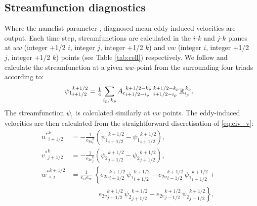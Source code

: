 \documentclass[../main/NEMO_manual]{subfiles}
\begin{document}
\subsection{Streamfunction diagnostics}
\label{sec:sfdiag}

Where the namelist parameter ,
diagnosed mean eddy-induced velocities are output.
Each time step, streamfunctions are calculated in the $i$-$k$ and $j$-$k$ planes at
$uw$ (integer +1/2 $i$, integer $j$, integer +1/2 $k$) and $vw$ (integer $i$, integer +1/2 $j$, integer +1/2 $k$)
points (see Table \autoref{tab:cell}) respectively.
We follow \citep{Griffies_Bk04} and calculate the streamfunction at a given $uw$-point from
the surrounding four triads according to:
\[
  {\psi_1}_{i+1/2}^{k+1/2}={\textstyle \frac{1}{4}}\sum_{\substack{i_p,\,k_p}}
  {A_e}_{i+1/2-i_p}^{k+1/2-k_p}\:{}_{i+1/2-i_p}^{k+1/2-k_p}{\mathbb{R}}_{i_p}^{\,k_p}.
\]
The streamfunction $\psi_1$ is calculated similarly at $vw$ points.
The eddy-induced velocities are then calculated from the straightforward discretisation of \autoref{eq:eiv_v}:
\[
  \begin{split}
    {u^*}_{i+1/2}^{k} & = - \frac{1}{{e_{3u}}_{i}^{k}}\left({\psi_1}_{i+1/2}^{k+1/2}-{\psi_1}_{i+1/2}^{k+1/2}\right),   \\
    {v^*}_{j+1/2}^{k} & = - \frac{1}{{e_{3v}}_{j}^{k}}\left({\psi_2}_{j+1/2}^{k+1/2}-{\psi_2}_{j+1/2}^{k+1/2}\right),   \\
    {w^*}_{i,j}^{k+1/2} & =    \frac{1}{e_{1t}e_{2t}}\; \left\{
      {e_{2u}}_{i+1/2}^{k+1/2} \,{\psi_1}_{i+1/2}^{k+1/2} -
      {e_{2u}}_{i-1/2}^{k+1/2} \,{\psi_1}_{i-1/2}^{k+1/2} \right. + \\
    \phantom{=} & \qquad\qquad\left. {e_{2v}}_{j+1/2}^{k+1/2} \,{\psi_2}_{j+1/2}^{k+1/2} - {e_{2v}}_{j-1/2}^{k+1/2} \,{\psi_2}_{j-1/2}^{k+1/2} \right\},
  \end{split}
\]

\biblio

\pindex
\end{document}
